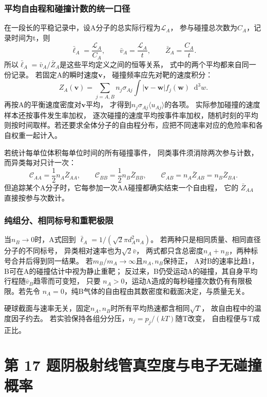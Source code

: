 \documentclass[UTF8,fontset=fandol,a4paper,11pt]{ctexart}
\newcommand{\dd}{\mathop{}\!\mathrm{d}}
\begin{document}
\subsubsection*{平均自由程和碰撞计数的统一口径}
在一段长的平稳记录中，设A分子的总实际行程为$\mathcal L_A$，
参与碰撞总次数为$C_A$，记录时间为t，则
\[
\bar\ell_A=\frac{\mathcal L_A}{C_A},\qquad
\bar v_A=\frac{\mathcal L_A}{t},\qquad
\bar Z_A=\frac{C_A}{t}.
\]
所以$\bar\ell_A=\bar v_A/\bar Z_A$是这些平均定义之间的恒等关系，
式中的两个平均都来自同一份记录。
若固定A的瞬时速度$\bm v$，
碰撞频率应先对靶的速度积分：
\[
Z_A(\bm v)=\sum_{j=A,B}n_j\sigma_{Aj}
\int|\bm v-\bm w|f_j(\bm w)\dd^3w.
\]
再按A的平衡速度密度对$\bm v$平均，
才得到$n_j\sigma_{Aj}\langle u_{Aj}\rangle$的各项。
实际参加碰撞的速度样本还按事件发生率加权，
逐次碰撞的速度平均按事件率加权，随机时刻的平均则按时间取样。若还要求全体分子的自由程分布，应把不同速率对应的危险率和各自权重一起计入。

若统计每单位体积每单位时间的所有碰撞事件，
同类事件须消除两次参与计数，而异类每对只计一次：
\[
\mathcal C_{AA}=\frac12n_A\bar Z_{AA},\qquad
\mathcal C_{BB}=\frac12n_B\bar Z_{BB},\qquad
\mathcal C_{AB}=n_A\bar Z_{AB}=n_B\bar Z_{BA}.
\]
但追踪某个A分子时，它每参加一次AA碰撞都确实结束一个自由程，
它的 $\bar Z_{AA}$ 直接按参与次数计。

\subsubsection*{纯组分、相同标号和重靶极限}
当$n_B\to0$时，A式回到
$\bar\ell_A=1/(\sqrt2\pi d_A^2n_A)$。
若两种只是相同质量、相同直径分子的不同标号，
异类相对速率也为$\sqrt2\bar v$，
两式都只含总密度$n_A+n_B$，两种标号合并后得到同一结果。
若$m_B/m_A\to\infty$且$n_A,n_B$保持正，
A对B的速率比趋1，B可在A的碰撞估计中视为静止重靶；
反过来，B仍受运动A的碰撞，其自身平均行程随$\bar v_B$趋零而可变短，
只要 $n_A>0$，运动A造成的每秒碰撞次数仍有有限极限。若先令 $n_A=0$，纯B气体的自由程由其数密度和截面决定，与质量无关。

硬球截面与速率无关，固定$n_A,n_B$时所有平均热速都含相同$\sqrt T$，
故自由程中的温度因子约去。
若实验保持各组分分压，$n_j=p_j/(kT)$随T改变，
自由程便与T成正比。




\section*{第 17 题\quad 阴极射线管真空度与电子无碰撞概率}
\end{document}
